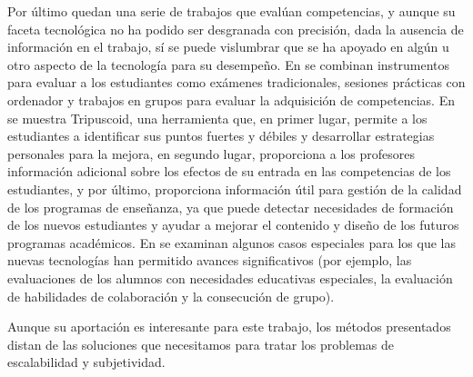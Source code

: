 Por último quedan una serie de trabajos que evalúan competencias, y aunque su faceta tecnológica no ha podido ser desgranada con precisión, dada la ausencia de información en el trabajo, sí se puede vislumbrar que se ha apoyado en algún u otro aspecto de la tecnología para su desempeño. En \cite{Velasco:2012} se combinan instrumentos para evaluar a los estudiantes como exámenes tradicionales, sesiones prácticas con ordenador y trabajos en grupos para evaluar la adquisición de competencias. En \cite{Achcaoucaou:2012} se muestra Tripuscoid, una herramienta que, en primer lugar, permite a los estudiantes a identificar sus puntos fuertes y débiles y desarrollar estrategias personales para la mejora, en segundo lugar, proporciona a los profesores información adicional sobre los efectos de su entrada en las competencias de los estudiantes, y por último, proporciona información útil para gestión de la calidad de los programas de enseñanza, ya que puede detectar necesidades de formación de los nuevos estudiantes y ayudar a mejorar el contenido y diseño de los futuros programas académicos. En \cite{BenoCsap:2012} se examinan algunos casos especiales para los que las nuevas tecnologías han permitido avances significativos (por ejemplo, las evaluaciones de los alumnos con necesidades educativas especiales, la evaluación de habilidades de colaboración y la consecución de grupo). 

Aunque su aportación es interesante para este trabajo, los métodos presentados distan de las soluciones que necesitamos para tratar los problemas de escalabilidad y subjetividad.



